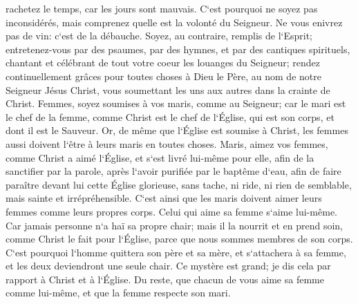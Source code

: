 \verse rachetez le temps, car les jours sont mauvais. 
\verse C`est pourquoi ne soyez pas inconsidérés, mais comprenez quelle est la volonté du Seigneur. 
\verse Ne vous enivrez pas de vin: c`est de la débauche. Soyez, au contraire, remplis de l`Esprit; 
\verse entretenez-vous par des psaumes, par des hymnes, et par des cantiques spirituels, chantant et célébrant de tout votre coeur les louanges du Seigneur; 
\verse rendez continuellement grâces pour toutes choses à Dieu le Père, au nom de notre Seigneur Jésus Christ, 
\verse vous soumettant les uns aux autres dans la crainte de Christ. 
\verse Femmes, soyez soumises à vos maris, comme au Seigneur; 
\verse car le mari est le chef de la femme, comme Christ est le chef de l`Église, qui est son corps, et dont il est le Sauveur. 
\verse Or, de même que l`Église est soumise à Christ, les femmes aussi doivent l`être à leurs maris en toutes choses. 
\verse Maris, aimez vos femmes, comme Christ a aimé l`Église, et s`est livré lui-même pour elle, 
\verse afin de la sanctifier par la parole, après l`avoir purifiée par le baptême d`eau, 
\verse afin de faire paraître devant lui cette Église glorieuse, sans tache, ni ride, ni rien de semblable, mais sainte et irrépréhensible. 
\verse C`est ainsi que les maris doivent aimer leurs femmes comme leurs propres corps. Celui qui aime sa femme s`aime lui-même. 
\verse Car jamais personne n`a haï sa propre chair; mais il la nourrit et en prend soin, comme Christ le fait pour l`Église, 
\verse parce que nous sommes membres de son corps. 
\verse C`est pourquoi l`homme quittera son père et sa mère, et s`attachera à sa femme, et les deux deviendront une seule chair. 
\verse Ce mystère est grand; je dis cela par rapport à Christ et à l`Église. 
\verse Du reste, que chacun de vous aime sa femme comme lui-même, et que la femme respecte son mari. 

